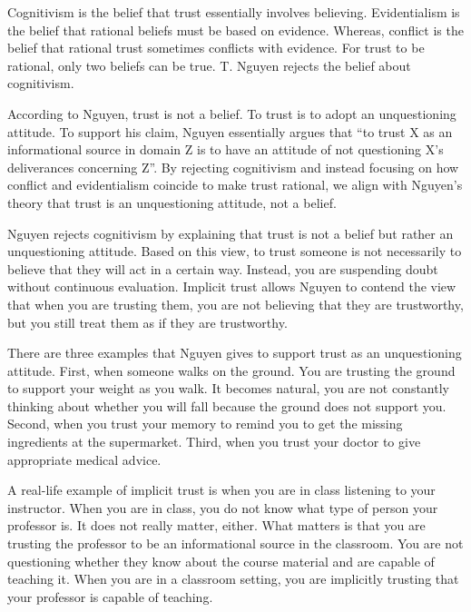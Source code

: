


Cognitivism is the belief that trust essentially involves believing. Evidentialism is the belief that rational beliefs must be based on evidence. Whereas, conflict is the belief that rational trust sometimes conflicts with evidence. For trust to be rational, only two beliefs can be true. T. Nguyen rejects the belief about cognitivism.

According to Nguyen, trust is not a belief. To trust is to adopt an unquestioning attitude. To support his claim, Nguyen essentially argues that “to trust X as an informational source in domain Z is to have an attitude of not questioning X’s deliverances concerning Z”. By rejecting cognitivism and instead focusing on how conflict and evidentialism coincide to make trust rational, we align with Nguyen’s theory that trust is an unquestioning attitude, not a belief.

Nguyen rejects cognitivism by explaining that trust is not a belief but rather an unquestioning attitude. Based on this view, to trust someone is not necessarily to believe that they will act in a certain way. Instead, you are suspending doubt without continuous evaluation. Implicit trust allows Nguyen to contend the view that when you are trusting them, you are not believing that they are trustworthy, but you still treat them as if they are trustworthy.

There are three examples that Nguyen gives to support trust as an unquestioning attitude. First, when someone walks on the ground. You are trusting the ground to support your weight as you walk. It becomes natural, you are not constantly thinking about whether you will fall because the ground does not support you. Second, when you trust your memory to remind you to get the missing ingredients at the supermarket. Third, when you trust your doctor to give appropriate medical advice. 

A real-life example of implicit trust is when you are in class listening to your instructor. When you are in class, you do not know what type of person your professor is. It does not really matter, either. What matters is that you are trusting the professor to be an informational source in the classroom. You are not questioning whether they know about the course material and are capable of teaching it. When you are in a classroom setting, you are implicitly trusting that your professor is capable of teaching.

